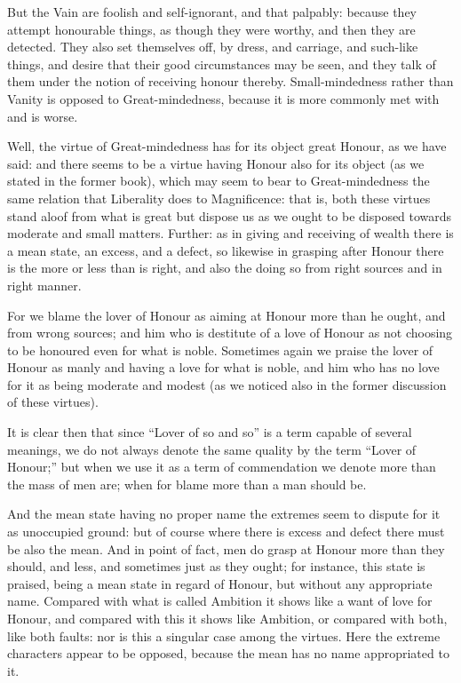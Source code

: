 But the Vain are foolish and self-ignorant, and that palpably: because they
attempt honourable things, as though they were worthy, and then they are
detected. They also set themselves off, by dress, and carriage, and such-like
things, and desire that their good circumstances may be seen, and they talk of
them under the notion of receiving honour thereby. Small-mindedness rather than
Vanity is opposed to Great-mindedness, because it is more commonly met with and
is worse.


Well, the virtue of Great-mindedness has for its object great Honour, as we
have said: and there seems to be a virtue having Honour also for its object (as
we stated in the former book), which may seem to bear to Great-mindedness the
same relation that Liberality does to Magnificence: that is, both these virtues
stand aloof from what is great but dispose us as we ought to be disposed
towards moderate and small matters. Further: as in giving and receiving of
wealth there is a mean state, an excess, and a defect, so likewise in grasping
after Honour there is the more or less than is right, and also the doing so
from right sources and in right manner.

For we blame the lover of Honour as aiming at Honour more than he ought, and
from wrong sources; and him who is destitute of a love of Honour as not
choosing to be honoured even for what is noble. Sometimes again we praise the
lover of Honour as manly and having a love for what is noble, and him who has
no love for it as being moderate and modest (as we noticed also in the former
discussion of these virtues).

It is clear then that since “Lover of so and so” is a term capable
of several meanings, we do not always denote the same quality by the term
“Lover of Honour;” but when we use it as a term of commendation we
denote more than the mass of men are; when for blame more than a man should be.

And the mean state having no proper name the extremes seem to dispute for it as
unoccupied ground: but of course where there is excess and defect there must be
also the mean. And in point of fact, men do grasp at Honour more than they
should, and less, and sometimes just as they ought; for instance, this state is
praised, being a mean state in regard of Honour, but without any appropriate
name. Compared with what is called Ambition it shows like a want of love for
Honour, and compared with this it shows like Ambition, or compared with both,
like both faults: nor is this a singular case among the virtues. Here the
extreme characters appear to be opposed, because the mean has no name
appropriated to it.

